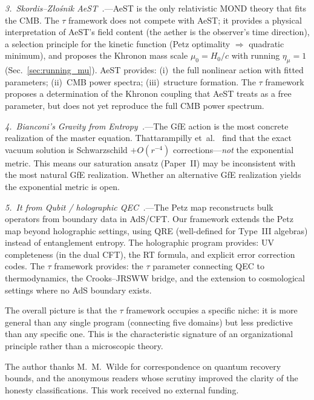 \documentclass[prd,twocolumn,superscriptaddress,longbibliography,floatfix]{revtex4-2}
\newcommand{\tauasym}{\tau}
\begin{document}
\emph{3.\ Skordis--Z\l{}o\'{s}nik
AeST~\cite{SkordisZlosnik2021}.}---AeST is the only
relativistic MOND theory that fits the CMB.  The
$\tauasym$ framework does not compete with AeST; it
provides a physical interpretation of AeST's field
content (the aether is the observer's time direction),
a selection principle for the kinetic function
(Petz optimality $\Rightarrow$ quadratic minimum),
and proposes the Khronon mass scale
$\mu_0 = H_0/c$ with running $\eta_\mu = 1$
(Sec.~\ref{sec:running_mu}).
AeST provides: (i)~the full nonlinear action with
fitted parameters; (ii)~CMB power spectra;
(iii)~structure formation.  The $\tauasym$ framework
proposes a determination of the Khronon coupling that
AeST treats as a free parameter, but does not yet
reproduce the full CMB power spectrum.

\emph{4.\ Bianconi's Gravity from
Entropy~\cite{Bianconi2025,BianconiCosmo2025}.}---The
GfE action is the most concrete realization of the
master equation.  Thattarampilly
et~al.~\cite{Thattarampilly2026} find that the
exact vacuum solution is Schwarzschild $+ O(r^{-4})$
corrections---\emph{not} the exponential metric.
This means our saturation ansatz (Paper~II) may be
inconsistent with the most natural GfE realization.
Whether an alternative GfE realization yields the
exponential metric is open.

\emph{5.\ It from Qubit / holographic
QEC~\cite{Cotler2019}.}---The Petz map reconstructs
bulk operators from boundary data in AdS/CFT.  Our
framework extends the Petz map beyond holographic
settings, using QRE (well-defined for Type~III
algebras) instead of entanglement entropy.  The
holographic program provides: UV completeness (in
the dual CFT), the RT formula, and explicit error
correction codes.  The $\tauasym$ framework provides:
the $\tauasym$ parameter connecting QEC to
thermodynamics, the Crooks--JRSWW bridge, and the
extension to cosmological settings where no AdS
boundary exists.

The overall picture is that the $\tauasym$
framework occupies a specific niche: it is more
general than any single program (connecting five
domains) but less predictive than any specific one.
This is the characteristic signature of an
organizational principle rather than a microscopic
theory.


\begin{acknowledgments}
The author thanks M.~M.~Wilde for correspondence on
quantum recovery bounds, and the anonymous readers whose
scrutiny improved the clarity of the honesty
classifications.
This work received no external funding.
\end{acknowledgments}
\end{document}
